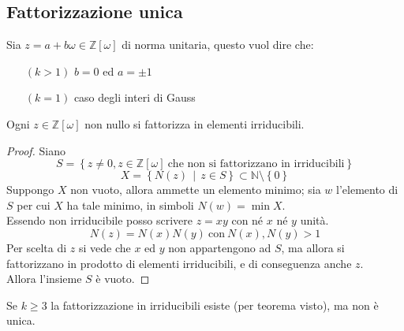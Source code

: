 \subsection{Fattorizzazione unica}
\begin{osservazione}
	Sia $z=a+b\omega\in\mathbb{Z}[\omega]$ di norma unitaria, questo vuol dire che:
	\begin{itemize}
		\item[$(k>1)$] $b=0$ ed $a=\pm1$
		\item[$(k=1)$] caso degli interi di Gauss
	\end{itemize}
\end{osservazione}
\begin{teorema}
	Ogni $z\in\mathbb{Z}[\omega]$ non nullo si fattorizza in elementi irriducibili.
\end{teorema}
\begin{proof}
	Siano
	\begin{equation*}
		S=\left\{z\neq0, z \in \mathbb{Z}[\omega] \ \text{che non si fattorizzano in irriducibili}\right\}
	\end{equation*}
	\begin{equation*}
		X=\left\{N(z) \, \mid \, z \in S\right\}\subset\mathbb{N}\setminus\left\{0\right\}
	\end{equation*}
	Suppongo $X$ non vuoto, allora ammette un elemento minimo; sia $w$ l'elemento di $S$ per cui $X$ ha tale minimo, in simboli $N(w)=\min X$. \\ Essendo non irriducibile posso scrivere $z=xy$ con né $x$ né $y$ unità.
	\begin{equation*}
	N(z)=N(x)N(y) \ \text{con} \ N(x),N(y)>1 
	\end{equation*}
	Per scelta di $z$ si vede che $x$ ed $y$ non appartengono ad $S$, ma allora si fattorizzano in prodotto di elementi irriducibili, e di conseguenza anche $z$. \\ Allora l'insieme $S$ è vuoto.
\end{proof}
\begin{proposizione}
	Se $k\geq3$ la fattorizzazione in irriducibili esiste (per teorema visto), ma non è unica.
\end{proposizione}
